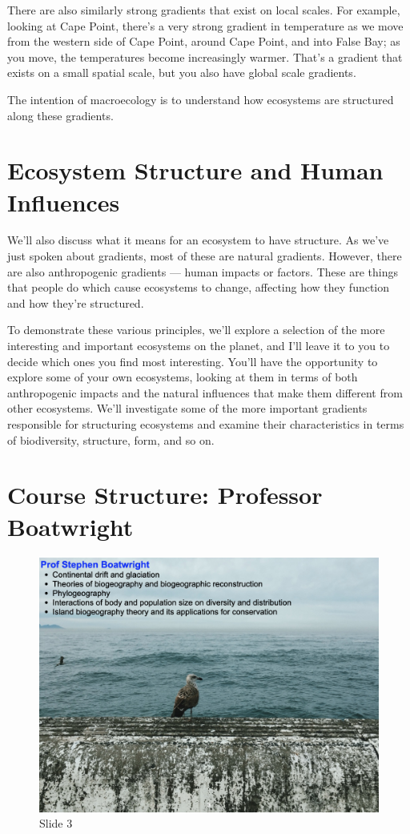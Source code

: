 \documentclass[
  10pt,
]{book}
\begin{document}
There are also similarly strong gradients that exist on local scales.
For example, looking at Cape Point, there's a very strong gradient in
temperature as we move from the western side of Cape Point, around Cape
Point, and into False Bay; as you move, the temperatures become
increasingly warmer. That's a gradient that exists on a small spatial
scale, but you also have global scale gradients.

The intention of macroecology is to understand how ecosystems are
structured along these gradients.

\section{Ecosystem Structure and Human
Influences}\label{ecosystem-structure-and-human-influences}

We'll also discuss what it means for an ecosystem to have structure. As
we've just spoken about gradients, most of these are natural gradients.
However, there are also anthropogenic gradients --- human impacts or
factors. These are things that people do which cause ecosystems to
change, affecting how they function and how they're structured.

To demonstrate these various principles, we'll explore a selection of
the more interesting and important ecosystems on the planet, and I'll
leave it to you to decide which ones you find most interesting. You'll
have the opportunity to explore some of your own ecosystems, looking at
them in terms of both anthropogenic impacts and the natural influences
that make them different from other ecosystems. We'll investigate some
of the more important gradients responsible for structuring ecosystems
and examine their characteristics in terms of biodiversity, structure,
form, and so on.

\section{Course Structure: Professor
Boatwright}\label{course-structure-professor-boatwright}

\begin{figure}[ht]
\centering
\includegraphics[width=0.8\linewidth]{../images/BDC334/BDC334-003.jpeg}
\caption*{Slide 3}
\end{figure}
\end{document}
